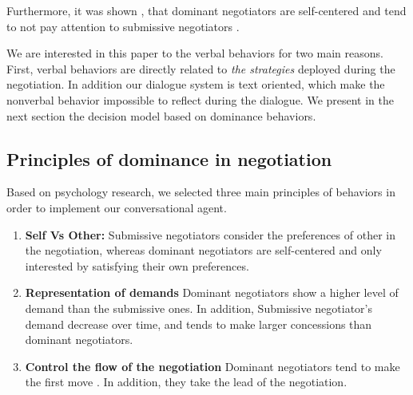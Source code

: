 \documentclass{llncs}
\begin{document}
	Furthermore, it was shown \cite{fiske1993controlling},\cite{de1995impact} that dominant negotiators are self-centered and tend to not pay attention to submissive negotiators .
	\par We are interested in this paper to the verbal behaviors for two main reasons. First, verbal behaviors are directly related to \emph{the strategies} deployed during the negotiation. In addition our dialogue system is text oriented, which make the nonverbal behavior impossible to reflect during the dialogue. 
	We present in the next section the decision model based on dominance behaviors. 
	
	\subsection{Principles of dominance in negotiation}
	Based on psychology research, we selected three main principles of behaviors in order to implement our conversational agent.
	\begin{enumerate}
	\item \textbf{Self Vs Other:} Submissive negotiators consider the preferences of other in the negotiation, whereas dominant negotiators  are self-centered and only interested by satisfying their own preferences.
	
	\item \textbf{Representation of demands} Dominant negotiators show a higher level of demand than the submissive ones. In addition,  Submissive negotiator's demand decrease over time, and tends to make larger concessions than dominant negotiators.
	
	\item \textbf{Control the flow of the negotiation}
	Dominant negotiators tend to make the first move \cite{magee2007power}. In addition, they take the lead of the negotiation.
	
	\end{enumerate}
	
	
\end{document}
